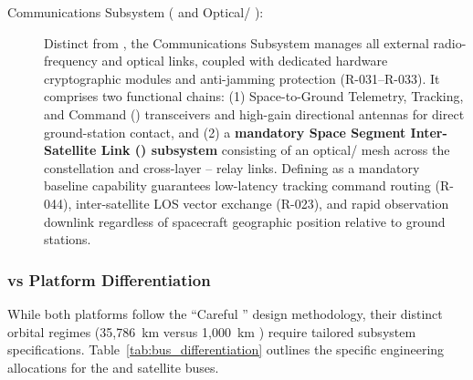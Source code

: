 \begin{description}
    \item[Communications Subsystem ( and Optical/ ):] Distinct from , the Communications Subsystem manages all external radio-frequency and optical links, coupled with dedicated hardware cryptographic modules and anti-jamming protection (R-031--R-033). It comprises two functional chains: (1) Space-to-Ground Telemetry, Tracking, and Command () transceivers and high-gain directional antennas for direct ground-station contact, and (2) a \textbf{mandatory Space Segment Inter-Satellite Link () subsystem} consisting of an optical/  mesh across the  constellation and cross-layer -- relay links. Defining  as a mandatory baseline capability guarantees low-latency tracking command routing (R-044), inter-satellite LOS vector exchange (R-023), and rapid observation downlink regardless of spacecraft geographic position relative to ground stations.
\end{description}

\subsubsection[GEO vs LEO Platform Differentiation]{ vs  Platform Differentiation}
While both platforms follow the ``Careful '' design methodology, their distinct orbital regimes (35,786~km  versus 1,000~km ) require tailored subsystem specifications. Table~\ref{tab:bus_differentiation} outlines the specific engineering allocations for the  and  satellite buses.

